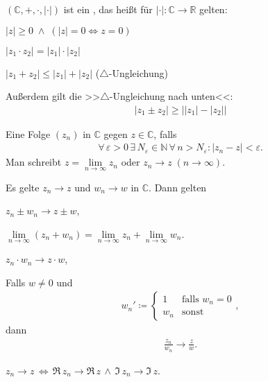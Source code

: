 \begin{theorem}[Satz]
  $(\mathbb{C},+,\cdot,|\cdot|)$ ist ein , das heißt für $|\cdot| : \mathbb{C} \to \mathbb{R}$ gelten:
  \begin{enum-arab}
    \item $|z| \geq 0 \; \land \; (|z| = 0 \iff z = 0)$
    
    \item $|z_1 \cdot z_2| = |z_1| \cdot |z_2|$
    
    \item $|z_1 + z_2| \leq |z_1| + |z_2|$ ($\bigtriangleup$-Ungleichung)
    
    Außerdem gilt die >>$\bigtriangleup$-Ungleichung nach unten<<:
    \begin{align*}
      |z_1 \pm z_2| \geq \Big| |z_1| - |z_2| \Big|
    \end{align*}
  \end{enum-arab}
\end{theorem}

\begin{theorem}[Definition]
  Eine Folge $(z_n)$ in $\mathbb{C}$  gegen $z \in \mathbb{C}$, falls
  \begin{align*}
    \forall \, \varepsilon > 0 \, \exists \, N_\varepsilon \in \mathbb{N} \, \forall \, n > N_\varepsilon : |z_n - z| < \varepsilon.
  \end{align*}
  Man schreibt $z = \lim\limits_{n \to \infty} z_n$ oder $z_n \to z \; (n \to \infty)$.
\end{theorem}

\begin{theorem}[Satz] \label{thm:1.6}
  Es gelte $z_n \to z$ und $w_n \to w$ in $\mathbb{C}$. Dann gelten
  \begin{enum-arab}
    \item $z_n \pm w_n \to z \pm w$,
    
    $\lim\limits_{n \to \infty} (z_n + w_n) = \lim\limits_{n \to \infty} z_n + \lim\limits_{n \to \infty} w_n$.
    
    \item $z_n \cdot w_n \to z \cdot w$,
    
    \item Falls $w \neq 0$ und
    \begin{align*}
      w_n' \coloneq
      \begin{cases}
        1 & \text{falls } w_n = 0 \\
        w_n & \text{sonst}
      \end{cases},
    \end{align*}
    dann
    \begin{align*}
      \frac{z_n}{w_n} \to \frac{z}{w}.
    \end{align*}
    
    \item $z_n \to z \, \iff \, \Re\, z_n \to \Re\, z \, \land \, \Im\, z_n \to \Im\, z$.
  \end{enum-arab}
\end{theorem}

